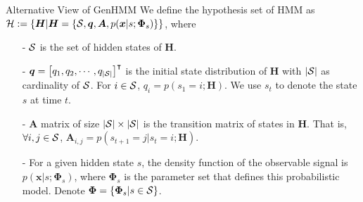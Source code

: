 \begin{frame}{Alternative View of GenHMM}
  We define the hypothesis set of HMM as $\mathcal{H} := \{\bm{H} | \bm{H}=\{\mathcal{S}, \bm{q}, \bm{A}, p(\bm{x}|{s}; \bm{\Phi}_{s})\}\}$, where
  \begin{itemize}
  \item[-] $\mathcal{S}$ is the set of hidden states of $\bm{H}$.
  \item[-] $\bm{q} = \left[ q_1, q_2, \cdots, q_{|\mathcal{S}|}\right]^\intercal$ is the initial state distribution of $\bm{H}$ with $|\mathcal{S}|$ as cardinality of $\mathcal{S}$. For $i \in \mathcal{S}$, $q_i = p(s_{1}=i;\bm{H})$. We use $s_t$ to denote the state $s$ at time $t$.
  \item[-] $\bm{A}$ matrix of size $|\mathcal{S}| \times |\mathcal{S}|$ is the transition matrix of states in $\bm{H}$. That is, $\forall i, j \in \mathcal{S}$,  $\bm{A}_{i,j} = p(s_{t+1}=j|s_{t}=i; \bm{H})$.
  \item[-] For a given hidden state $s$, the density function of the observable signal is $p({\bm{x}}|{s};\bm{\Phi}_{s})$, where $\bm{\Phi}_{s}$ is the parameter set that defines this probabilistic model. Denote $\bm{\Phi} = \left\{ \bm{\Phi}_{s}| s \in \mathcal{S} \right\}$.
  \end{itemize}
\end{frame}




